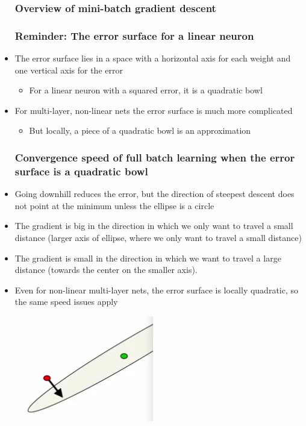 \begin{itemize}
	\subsubsection{Overview of mini-batch gradient descent}
	\subsubsection{Reminder: The error surface for a linear neuron}
	\item The error surface lies in a space with a horizontal axis for each weight and one vertical axis for the error
	\begin{itemize}
		\item For a linear neuron with a squared error, it is a quadratic bowl
	\end{itemize}

	\item For multi-layer, non-linear nets the error surface is much more complicated
	\begin{itemize}
		\item But locally, a piece of a quadratic bowl is an approximation
	\end{itemize}

	\subsubsection{Convergence speed of full batch learning when the error surface is a quadratic bowl}
	\item Going downhill reduces the error, but the direction of steepest descent does not point at the minimum unless the ellipse is a circle
	\item The gradient is big in the direction in which we only want to travel a small distance (larger axis of ellipse, where we only want to travel a small distance)
	\item The gradient is small in the direction in which we want to travel a large distance (towards the center on the smaller axis).
	\item Even for non-linear multi-layer nets, the error surface is locally quadratic, so the same speed issues apply
	\begin{center}
		\includegraphics[scale=0.9]{sections/6/ellipse.png}
	\end{center}


\end{itemize}
